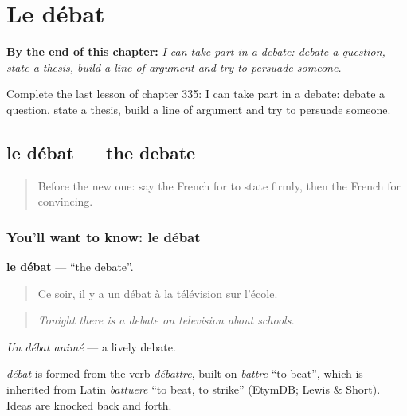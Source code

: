 
\chapter{Le débat}
\label{ch:fr-le-debat}

\begin{chapteropening}
\textbf{By the end of this chapter:} \emph{I can take part in a debate: debate a question, state a thesis, build a line of argument and try to persuade someone.}

Complete the last lesson of chapter 335: I can take part in a debate: debate a question, state a thesis, build a line of argument and try to persuade someone.
\end{chapteropening}

\section[le débat]{le débat — the debate}

\label{lesson:FR-C335-debat}



\begin{quote}
Before the new one: say the French for to state firmly, then the French for convincing.
\end{quote}

\subsection*{You'll want to know: le débat}
\textbf{le débat} — \textquotedblleft{}the debate\textquotedblright{}.

\begin{quote}
Ce soir, il y a un débat à la télévision sur l'école.
\end{quote}

\begin{quote}
\emph{Tonight there is a debate on television about schools.}
\end{quote}

\emph{Un débat animé} — a lively debate.

\begin{cousinweb}
\emph{débat} is formed from the verb \emph{débattre}, built on \emph{battre} \textquotedblleft{}to beat\textquotedblright{}, which is inherited from Latin \emph{battuere} \textquotedblleft{}to beat, to strike\textquotedblright{} (EtymDB; Lewis \& Short). Ideas are knocked back and forth.
\end{cousinweb}

